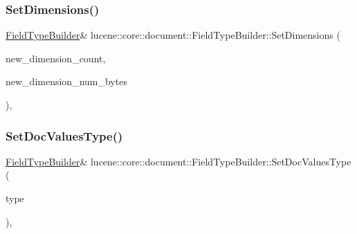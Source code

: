 \mbox{\label{classlucene_1_1core_1_1document_1_1FieldTypeBuilder_afb8590925369c20efe5ac740cf9b347e}} 
\subsubsection{\texorpdfstring{Set\+Dimensions()}{SetDimensions()}}
{\footnotesize\ttfamily \mbox{\hyperlink{classlucene_1_1core_1_1document_1_1FieldTypeBuilder}{Field\+Type\+Builder}}\& lucene\+::core\+::document\+::\+Field\+Type\+Builder\+::\+Set\+Dimensions (\begin{DoxyParamCaption}\item[{\mbox{\hyperlink{ZlibCrc32_8h_a2c212835823e3c54a8ab6d95c652660e}{const}} uint32\+\_\+t}]{new\+\_\+dimension\+\_\+count,  }\item[{\mbox{\hyperlink{ZlibCrc32_8h_a2c212835823e3c54a8ab6d95c652660e}{const}} uint32\+\_\+t}]{new\+\_\+dimension\+\_\+num\+\_\+bytes }\end{DoxyParamCaption})\hspace{0.3cm}{\ttfamily [inline]}, {\ttfamily [noexcept]}}

\mbox{\label{classlucene_1_1core_1_1document_1_1FieldTypeBuilder_afd676ba9b2f4ea66df406f81efc4558c}} 
\subsubsection{\texorpdfstring{Set\+Doc\+Values\+Type()}{SetDocValuesType()}}
{\footnotesize\ttfamily \mbox{\hyperlink{classlucene_1_1core_1_1document_1_1FieldTypeBuilder}{Field\+Type\+Builder}}\& lucene\+::core\+::document\+::\+Field\+Type\+Builder\+::\+Set\+Doc\+Values\+Type (\begin{DoxyParamCaption}\item[{\mbox{\hyperlink{ZlibCrc32_8h_a2c212835823e3c54a8ab6d95c652660e}{const}} \mbox{\hyperlink{namespacelucene_1_1core_1_1index_a2f7ffaef6429b5df542c8aa12f8b9883}{lucene\+::core\+::index\+::\+Doc\+Values\+Type}}}]{type }\end{DoxyParamCaption})\hspace{0.3cm}{\ttfamily [inline]}, {\ttfamily [noexcept]}}

